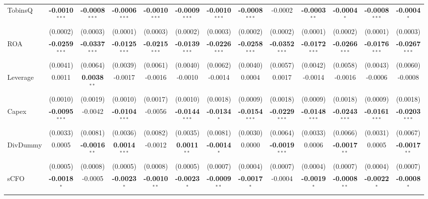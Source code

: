 \begin{landscape}
\begin{table}[H]
\begin{tabular}{lcccccccccccc}
TobinsQ & \textbf{-0.0010}$^{***}$ & \textbf{-0.0008}$^{***}$ & \textbf{-0.0006}$^{***}$ & \textbf{-0.0010}$^{***}$ & \textbf{-0.0009}$^{***}$ & \textbf{-0.0010}$^{***}$ & \textbf{-0.0008}$^{***}$ & -0.0002 & \textbf{-0.0003}$^{**}$ & \textbf{-0.0004}$^{*}$ & \textbf{-0.0008}$^{***}$ & \textbf{-0.0004}$^{*}$ \\
 & (0.0002) & (0.0003) & (0.0001) & (0.0003) & (0.0002) & (0.0003) & (0.0002) & (0.0002) & (0.0001) & (0.0002) & (0.0001) & (0.0003) \\
ROA & \textbf{-0.0259}$^{***}$ & \textbf{-0.0337}$^{***}$ & \textbf{-0.0125}$^{***}$ & \textbf{-0.0215}$^{***}$ & \textbf{-0.0139}$^{***}$ & \textbf{-0.0226}$^{***}$ & \textbf{-0.0258}$^{***}$ & \textbf{-0.0352}$^{***}$ & \textbf{-0.0172}$^{***}$ & \textbf{-0.0266}$^{***}$ & \textbf{-0.0176}$^{***}$ & \textbf{-0.0267}$^{***}$ \\
 & (0.0041) & (0.0064) & (0.0039) & (0.0061) & (0.0040) & (0.0062) & (0.0040) & (0.0057) & (0.0042) & (0.0058) & (0.0043) & (0.0060) \\
Leverage & 0.0011 & \textbf{0.0038}$^{**}$ & -0.0017 & -0.0016 & -0.0010 & -0.0014 & 0.0004 & 0.0017 & -0.0014 & -0.0016 & -0.0006 & -0.0008 \\
 & (0.0010) & (0.0019) & (0.0010) & (0.0017) & (0.0010) & (0.0018) & (0.0009) & (0.0018) & (0.0009) & (0.0018) & (0.0009) & (0.0018) \\
Capex & \textbf{-0.0095}$^{***}$ & -0.0042 & \textbf{-0.0104}$^{***}$ & -0.0056 & \textbf{-0.0144}$^{***}$ & \textbf{-0.0134}$^{*}$ & \textbf{-0.0154}$^{***}$ & \textbf{-0.0229}$^{***}$ & \textbf{-0.0148}$^{***}$ & \textbf{-0.0243}$^{***}$ & \textbf{-0.0161}$^{***}$ & \textbf{-0.0203}$^{***}$ \\
 & (0.0033) & (0.0081) & (0.0036) & (0.0082) & (0.0035) & (0.0081) & (0.0030) & (0.0064) & (0.0033) & (0.0066) & (0.0031) & (0.0067) \\
DivDummy & 0.0005 & \textbf{-0.0016}$^{**}$ & \textbf{0.0014}$^{***}$ & -0.0012 & \textbf{0.0011}$^{**}$ & \textbf{-0.0014}$^{*}$ & 0.0000 & \textbf{-0.0019}$^{***}$ & 0.0006 & \textbf{-0.0017}$^{**}$ & 0.0005 & \textbf{-0.0017}$^{**}$ \\
 & (0.0005) & (0.0008) & (0.0005) & (0.0008) & (0.0005) & (0.0007) & (0.0004) & (0.0007) & (0.0004) & (0.0007) & (0.0004) & (0.0007) \\
sCFO & \textbf{-0.0018}$^{*}$ & -0.0005 & \textbf{-0.0023}$^{*}$ & \textbf{-0.0010}$^{**}$ & \textbf{-0.0023}$^{*}$ & \textbf{-0.0009}$^{**}$ & \textbf{-0.0017}$^{*}$ & -0.0004 & \textbf{-0.0019}$^{*}$ & \textbf{-0.0008}$^{**}$ & \textbf{-0.0022}$^{*}$ & \textbf{-0.0008}$^{*}$ \\

\end{tabular}
\end{table}
\end{landscape}
